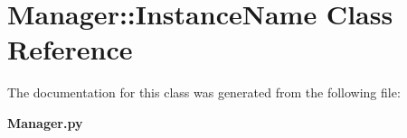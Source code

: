 \section{Manager::Instance\-Name Class Reference}
\label{classManager_1_1InstanceName}


The documentation for this class was generated from the following file:\begin{CompactItemize}
\item 
{\bf Manager.py}\end{CompactItemize}
